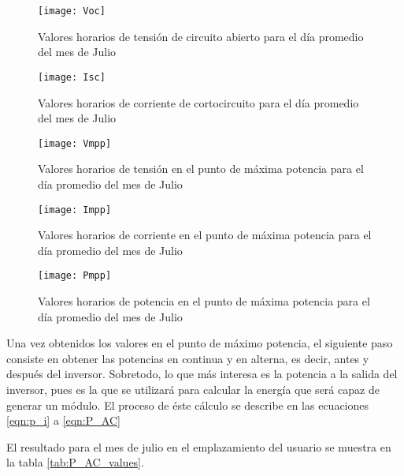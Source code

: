 \begin{figure}[H]
\texttt{[image: Voc]}
\centering
\caption{Valores horarios de tensión de circuito abierto para el día promedio del mes de Julio}
\label{fig:Voc}
\end{figure}

\begin{figure}[H]
\texttt{[image: Isc]}
\centering
\caption{Valores horarios de corriente de cortocircuito para el día promedio del mes de Julio}
\label{fig:isc}
\end{figure}

\begin{figure}[H]
\texttt{[image: Vmpp]}
\centering
\caption{Valores horarios de tensión en el punto de máxima potencia para el día promedio del mes de Julio}
\label{fig:vmpp}
\end{figure}

\begin{figure}[H]
\texttt{[image: Impp]}
\centering
\caption{Valores horarios de corriente en el punto de máxima potencia para el día promedio del mes de Julio}
\label{fig:impp}
\end{figure}

\begin{figure}[H]
\texttt{[image: Pmpp]}
\centering
\caption{Valores horarios de potencia en el punto de máxima potencia para el día promedio del mes de Julio}
\label{fig:pmpp}
\end{figure}

Una vez obtenidos los valores en el punto de máximo potencia, el siguiente paso consiste en obtener las potencias en continua y en alterna, es decir, antes y después del inversor. Sobretodo, lo que más interesa es la potencia a la salida del inversor, pues es la que se utilizará para calcular la energía que será capaz de generar un módulo. El proceso de éste cálculo se describe en las ecuaciones \ref{eqn:p_i} a \ref{eqn:P_AC}

El resultado para el mes de julio en el emplazamiento del usuario se muestra en la tabla \ref{tab:P_AC_values}.

